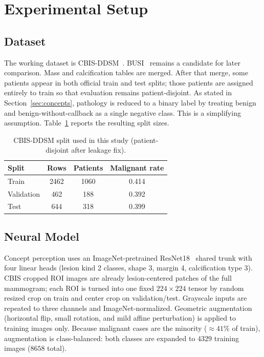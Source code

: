 \section{Experimental Setup}
\label{sec:experiments}

\subsection{Dataset}
\label{sec:dataset}

The working dataset is CBIS-DDSM~\cite{lee2017cbis}. BUSI~\cite{aldhabyani2020busi} remains a candidate for later comparison. Mass and calcification tables are merged. After that merge, some patients appear in both official train and test splits; those patients are assigned entirely to train so that evaluation remains patient-disjoint. As stated in Section~\ref{sec:concepts}, pathology is reduced to a binary label by treating benign and benign-without-callback as a single negative class. This is a simplifying assumption. Table~\ref{tab:dataset} reports the resulting split sizes.

\begin{table}[!t]
\caption{CBIS-DDSM split used in this study (patient-disjoint after leakage fix).}
\label{tab:dataset}
\centering
\small
\begin{tabular}{@{}lccc@{}}
\toprule
Split & Rows & Patients & Malignant rate \\
\midrule
Train & 2462 & 1060 & 0.414 \\
Validation & 462 & 188 & 0.392 \\
Test & 644 & 318 & 0.399 \\
\bottomrule
\end{tabular}
\end{table}

\subsection{Neural Model}
\label{sec:neural}

Concept perception uses an ImageNet-pretrained ResNet18~\cite{he2016resnet} shared trunk with four linear heads (lesion kind 2 classes, shape 3, margin 4, calcification type 3). CBIS cropped ROI images are already lesion-centered patches of the full mammogram; each ROI is turned into one fixed $224\times 224$ tensor by random resized crop on train and center crop on validation/test. Grayscale inputs are repeated to three channels and ImageNet-normalized. Geometric augmentation (horizontal flip, small rotation, and mild affine perturbation) is applied to training images only. Because malignant cases are the minority ($\approx 41\%$ of train), augmentation is class-balanced: both classes are expanded to $4329$ training images ($8658$ total).


